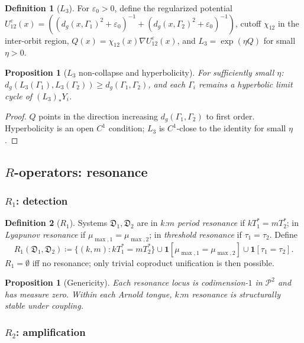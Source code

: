 \documentclass[12pt, oneside]{book}
\theoremstyle{plain}
\newtheorem{proposition}[theorem]{Proposition}
\theoremstyle{definition}
\newtheorem{definition}{Definition}[section]
\theoremstyle{remark}
\newcommand{\dm}{\mathfrak{D}}
\newcommand{\Orb}{\Gamma}
\newcommand{\cP}{\mathcal{P}}
\newcommand{\eps}{\varepsilon}
\newcommand{\dg}{d_g}
\begin{document}
\begin{definition}[$L_3$]\label{def:L3}
For $\eps_0>0$, define the regularized potential
$U_{12}^\eps(x)=((\dg(x,\Orb_1)^2+\eps_0)^{-1}+(\dg(x,\Orb_2)^2+\eps_0)^{-1})$,
cutoff $\chi_{12}$ in the inter-orbit region,
$Q(x)=\chi_{12}(x)\nabla U_{12}^\eps(x)$,
and $L_3=\exp(\eta Q)$ for small $\eta>0$.
\end{definition}

\begin{proposition}[$L_3$ non-collapse and hyperbolicity]\label{prop:L3}
For sufficiently small $\eta$:
$\dg(L_3(\Orb_1),L_3(\Orb_2))\ge\dg(\Orb_1,\Orb_2)$,
and each $\Orb_i$ remains a hyperbolic limit cycle of $(L_3)_*Y_i$.
\end{proposition}
\begin{proof}
$Q$ points in the direction increasing $\dg(\Orb_1,\Orb_2)$ to first
order. Hyperbolicity is an open $C^1$ condition; $L_3$ is $C^1$-close
to the identity for small $\eta$.
\end{proof}

\subsection{\texorpdfstring{$R$}{R}-operators: resonance}
\label{subsec:R}

\subsubsection{\texorpdfstring{$R_1$}{R1}: detection}

\begin{definition}[$R_1$]\label{def:R1}
Systems $\dm_1,\dm_2$ are in \emph{$k$:$m$ period resonance}
if $kT_1^*=mT_2^*$; in \emph{Lyapunov resonance} if
$\mu_{\max,1}=\mu_{\max,2}$; in \emph{threshold resonance} if
$\tau_1=\tau_2$. Define
\[
  R_1(\dm_1,\dm_2)\coloneqq
  \{(k,m):kT_1^*=mT_2^*\}\cup\mathbf{1}[\mu_{\max,1}=\mu_{\max,2}]
  \cup\mathbf{1}[\tau_1=\tau_2].
\]
$R_1=\emptyset$ iff no resonance; only trivial coproduct
unification is then possible.
\end{definition}

\begin{proposition}[Genericity]\label{prop:R1}
Each resonance locus is codimension-$1$ in $\cP^2$ and has measure
zero. Within each Arnold tongue, $k$:$m$ resonance is structurally
stable under coupling.
\end{proposition}

\subsubsection{\texorpdfstring{$R_2$}{R2}: amplification}
\end{document}
